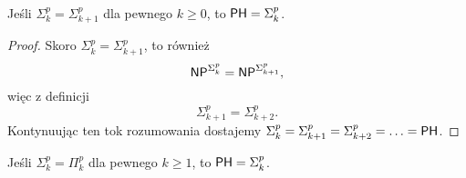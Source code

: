 \begin{theorem}
    Jeśli $\Sigma_k^p = \Sigma_{k+1}^p$ dla pewnego $k \geq 0$, to $\textsf{PH} = \Sigma_k^p$.
\end{theorem}
\begin{proof}
    Skoro $\Sigma_k^p = \Sigma_{k+1}^p$, to również
    \[ \textsf{NP}^{\Sigma_k^p} = \textsf{NP}^{\Sigma_{k+1}^p}, \]
    więc z definicji
    \[ \Sigma_{k+1}^p = \Sigma_{k+2}^p. \]
    Kontynuując ten tok rozumowania dostajemy $\Sigma_k^p = \Sigma_{k+1}^p = \Sigma_{k+2}^p = \ldots = \textsf{PH}$.
\end{proof}

\begin{theorem}
    Jeśli $\Sigma_k^p = \Pi_k^p$ dla pewnego $k \geq 1$, to $\textsf{PH} = \Sigma_k^p$.
\end{theorem}
